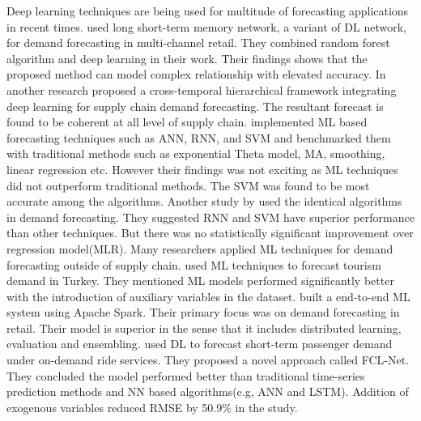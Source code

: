 Deep learning techniques are being used for multitude of forecasting applications in recent times. \citeauthor*{punia_deep_2020} used long short-term memory network, a variant of DL network, for demand forecasting in multi-channel retail. They combined random forest algorithm and deep learning in their work. Their findings shows that the proposed method can model complex relationship with elevated accuracy\cite{punia_deep_2020}.
In another research \citeauthor{punia_cross-temporal_2020} proposed a cross-temporal hierarchical framework integrating deep learning for supply chain demand forecasting. The resultant forecast is found to be coherent at all level of supply chain\cite{punia_cross-temporal_2020}.
\citeauthor*{carbonneau_machine_2007} implemented ML based forecasting techniques such as ANN, RNN, and SVM and benchmarked them with traditional methods such as exponential Theta model, MA, smoothing, linear regression etc. However their findings was not exciting as ML techniques did not outperform traditional methods. The SVM was found to be most accurate among the algorithms\cite{carbonneau_machine_2007}.
Another study by \citeauthor*{carbonneau_application_2008} used the identical algorithms in demand forecasting. They suggested RNN and SVM have superior performance than other techniques. But there was no statistically significant improvement over regression model(MLR)\cite{carbonneau_application_2008}.
Many researchers applied ML techniques for demand forecasting outside of supply chain. \citeauthor*{cankurt_developing_2015} used ML techniques to forecast tourism demand in Turkey. They mentioned ML models performed significantly better with the introduction of auxiliary variables in the dataset\cite{cankurt_developing_2015}.
\citeauthor{bose_probabilistic_2017} built a end-to-end ML system using Apache Spark. Their primary focus was on demand forecasting in retail. Their model is superior in the sense that it includes distributed learning, evaluation and ensembling\cite{bose_probabilistic_2017}.
\citeauthor*{ke_short-term_2017} used DL to forecast short-term passenger demand under on-demand ride services. They proposed a novel approach called FCL-Net. They concluded the model performed better than traditional time-series prediction methods and NN based algorithms(e.g, ANN and LSTM). Addition of exogenous variables reduced RMSE by 50.9\% in the study\cite{ke_short-term_2017}.

